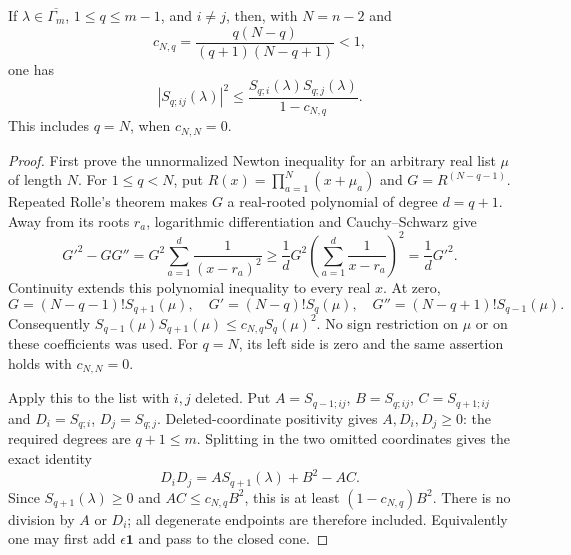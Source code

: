 \begin{lemma}\label{draft623:deleted-newton}
If $\lambda\in\overline{\Gamma_m}$, $1\leq q\leq m-1$, and $i\ne j$,
then, with $N=n-2$ and
\[
 c_{N,q}=\frac{q(N-q)}{(q+1)(N-q+1)}<1,
\]
one has
\[
 |S_{q;ij}(\lambda)|^2
 \leq\frac{S_{q;i}(\lambda)S_{q;j}(\lambda)}{1-c_{N,q}}.
\]
This includes $q=N$, when $c_{N,N}=0$.
\end{lemma}
\begin{proof}
First prove the unnormalized Newton inequality for an arbitrary real
list $\mu$ of length $N$. For $1\leq q<N$, put
$R(x)=\prod_{a=1}^N(x+\mu_a)$ and
$G=R^{(N-q-1)}$. Repeated Rolle's theorem makes $G$ a real-rooted
polynomial of degree $d=q+1$. Away from its roots $r_a$, logarithmic
differentiation and Cauchy--Schwarz give
\[
 G'^2-GG''=G^2\sum_{a=1}^d\frac1{(x-r_a)^2}
 \geq \frac1dG^2\left(\sum_{a=1}^d\frac1{x-r_a}\right)^2
 =\frac1dG'^2.
\]
Continuity extends this polynomial inequality to every real $x$.
At zero,
\[
 G=(N-q-1)!S_{q+1}(\mu),\quad
 G'=(N-q)!S_q(\mu),\quad
 G''=(N-q+1)!S_{q-1}(\mu).
\]
Consequently
$S_{q-1}(\mu)S_{q+1}(\mu)\leq c_{N,q}S_q(\mu)^2$.
No sign restriction on $\mu$ or on these coefficients was used.
For $q=N$, its left side is zero and the same assertion holds
with $c_{N,N}=0$.

Apply this to the list with $i,j$ deleted. Put
$A=S_{q-1;ij}$, $B=S_{q;ij}$, $C=S_{q+1;ij}$ and
$D_i=S_{q;i}$, $D_j=S_{q;j}$. Deleted-coordinate positivity gives
$A,D_i,D_j\geq0$: the required degrees are $q+1\leq m$.
Splitting in the two omitted coordinates gives the exact identity
\[
 D_iD_j=A S_{q+1}(\lambda)+B^2-AC.
\]
Since $S_{q+1}(\lambda)\geq0$ and $AC\leq c_{N,q}B^2$, this is
at least $(1-c_{N,q})B^2$. There is no division by $A$ or $D_i$;
all degenerate endpoints are therefore included. Equivalently one
may first add $\epsilon\mathbf1$ and pass to the closed cone.
\end{proof}

